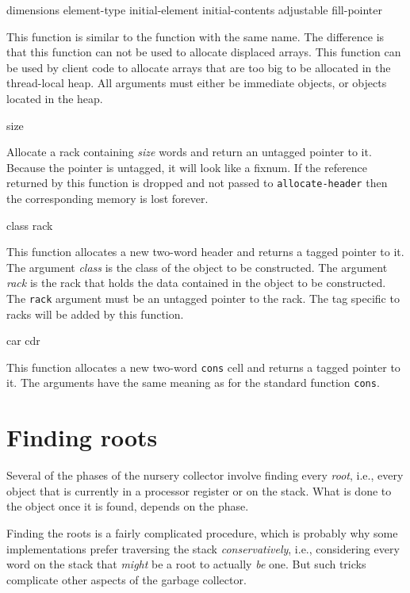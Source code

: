  {dimensions \key element-type initial-element
  initial-contents adjustable fill-pointer}

This function is similar to the \commonlisp{} function with the same
name.  The difference is that this function can not be used to
allocate displaced arrays.  This function can be used by client code
to allocate arrays that are too big to be allocated in the
thread-local heap.  All arguments must either be immediate objects, or
objects located in the heap.

 {size}

Allocate a rack containing \textit{size} words and return an untagged
pointer to it.  Because the pointer is untagged, it will look like a
fixnum.  If the reference returned by this function is dropped and not
passed to \texttt{allocate-header} then the corresponding memory is
lost forever.

 {class rack}

This function allocates a new two-word header and returns a tagged
pointer to it.  The argument \textit{class} is the class of the object
to be constructed.  The argument \textit{rack} is the rack that holds
the data contained in the object to be constructed.  The \texttt{rack}
argument must be an untagged pointer to the rack.  The tag specific to
racks will be added by this function.

 {car cdr}

This function allocates a new two-word \texttt{cons} cell and returns
a tagged pointer to it.  The arguments have the same meaning as for
the standard \commonlisp{} function \texttt{cons}.

\section{Finding roots}
\label{sec-garbage-collection-finding-roots}

Several of the phases of the nursery collector involve finding every
\emph{root}, i.e., every \commonlisp{} object that is currently in a
processor register or on the stack.  What is done to the object once
it is found, depends on the phase.

Finding the roots is a fairly complicated procedure, which is probably
why some implementations prefer traversing the stack
\emph{conservatively}, i.e., considering every word on the stack that
\emph{might} be a root to actually \emph{be} one.  But such tricks
complicate other aspects of the garbage collector.

